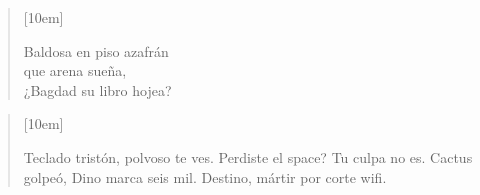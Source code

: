 \begin{verse}[10em]
	\begin{altverse}
		Baldosa en piso azafrán\\
		que arena sueña,\\
		¿Bagdad su libro hojea?\\
	\end{altverse}
\end{verse}

\begin{verse}[10em]
	\begin{altverse}
		Teclado tristón, polvoso te ves.
		Perdiste el space? Tu culpa no es.
    Cactus golpeó, Dino marca seis mil.
    Destino, mártir por corte wifi.
	\end{altverse}
\end{verse}
